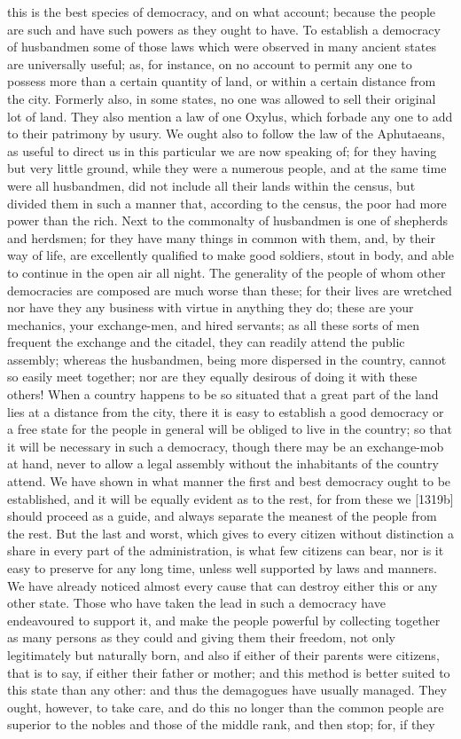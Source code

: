 \documentclass[12pt]{article}
\begin{document}
this is the best species of democracy, and on what account; because the people are such and have such powers as they ought to have. To establish a democracy of husbandmen some of those laws which were observed in many ancient states are universally useful; as, for instance, on no account to permit any one to possess more than a certain quantity of land, or within a certain distance from the city. Formerly also, in some states, no one was allowed to sell their original lot of land. They also mention a law of one Oxylus, which forbade any one to add to their patrimony by usury. We ought also to follow the law of the Aphutaeans, as useful to direct us in this particular we are now speaking of; for they having but very little ground, while they were a numerous people, and at the same time were all husbandmen, did not include all their lands within the census, but divided them in such a manner that, according to the census, the poor had more power than the rich. Next to the commonalty of husbandmen is one of shepherds and herdsmen; for they have many things in common with them, and, by their way of life, are excellently qualified to make good soldiers, stout in body, and able to continue in the open air all night. The generality of the people of whom other democracies are composed are much worse than these; for their lives are wretched nor have they any business with virtue in anything they do; these are your mechanics, your exchange-men, and hired servants; as all these sorts of men frequent the exchange and the citadel, they can readily attend the public assembly; whereas the husbandmen, being more dispersed in the country, cannot so easily meet together; nor are they equally desirous of doing it with these others! When a country happens to be so situated that a great part of the land lies at a distance from the city, there it is easy to establish a good democracy or a free state for the people in general will be obliged to live in the country; so that it will be necessary in such a democracy, though there may be an exchange-mob at hand, never to allow a legal assembly without the inhabitants of the country attend. We have shown in what manner the first and best democracy ought to be established, and it will be equally evident as to the rest, for from these we [1319b] should proceed as a guide, and always separate the meanest of the people from the rest. But the last and worst, which gives to every citizen without distinction a share in every part of the administration, is what few citizens can bear, nor is it easy to preserve for any long time, unless well supported by laws and manners. We have already noticed almost every cause that can destroy either this or any other state. Those who have taken the lead in such a democracy have endeavoured to support it, and make the people powerful by collecting together as many persons as they could and giving them their freedom, not only legitimately but naturally born, and also if either of their parents were citizens, that is to say, if either their father or mother; and this method is better suited to this state than any other: and thus the demagogues have usually managed. They ought, however, to take care, and do this no longer than the common people are superior to the nobles and those of the middle rank, and then stop; for, if they 
\end{document}
